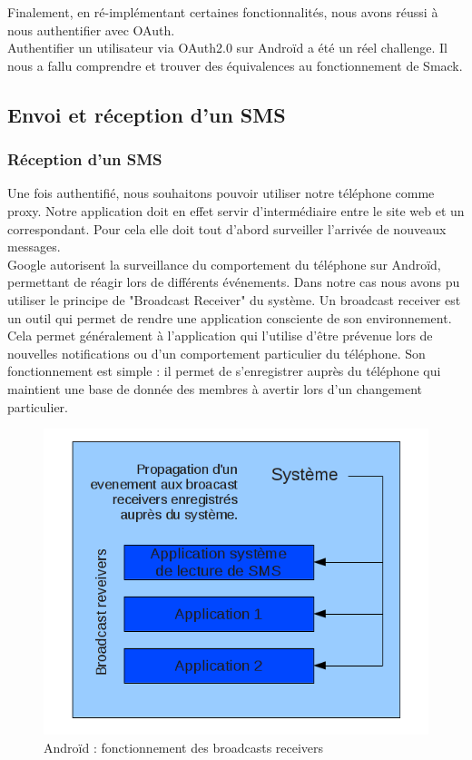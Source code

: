 Finalement, en ré-implémentant certaines fonctionnalités, nous avons réussi à nous authentifier avec OAuth.
\\


Authentifier un utilisateur via OAuth2.0 sur Androïd a été un réel challenge. Il nous a fallu comprendre 
et trouver des équivalences au fonctionnement de Smack.



\subsection{Envoi et réception d'un SMS}

\subsubsection{Réception d'un SMS}

Une fois authentifié, nous souhaitons pouvoir utiliser notre téléphone comme proxy. Notre application
doit en effet servir d'intermédiaire entre le site web et un correspondant. Pour cela elle doit tout
d'abord surveiller l'arrivée de nouveaux messages. 
\\


Google autorisent la surveillance du comportement du téléphone sur Androïd, permettant de réagir lors de différents événements.
Dans notre cas nous avons pu utiliser le principe de "Broadcast Receiver" du système. 
Un broadcast receiver est un outil qui permet de rendre une application consciente de son environnement.
Cela permet généralement à l'application qui l'utilise d'être prévenue lors de nouvelles notifications ou 
d'un comportement particulier du téléphone.
Son fonctionnement est simple : il permet de s'enregistrer auprès du téléphone qui maintient une base de donnée des membres à avertir lors d'un changement particulier.

\begin{figure}[!h]
  \center
  \includegraphics[width=12cm]{img/broadcast-receivers.png}
  \caption{Androïd : fonctionnement des broadcasts receivers}
  \label{broadcast-receivers}
\end{figure}

